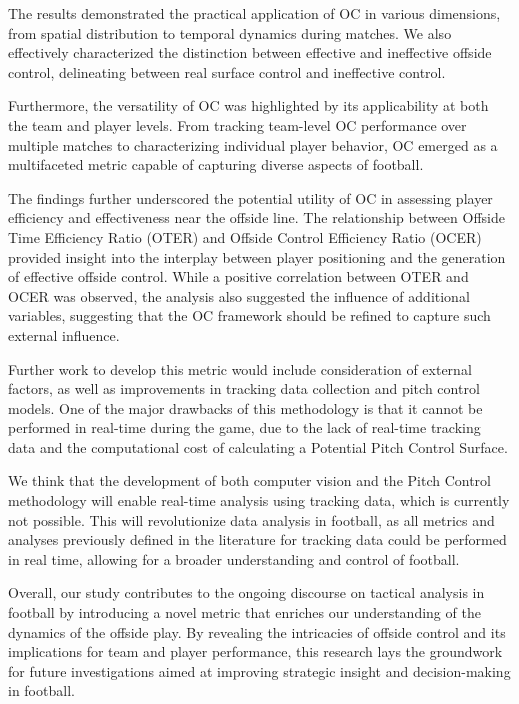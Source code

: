 \documentclass[
  10pt,
  twoside,nohyper]{book}
\begin{document}
The results demonstrated the practical application of OC in various dimensions, from spatial distribution to temporal dynamics during matches. We also effectively characterized the distinction between effective and ineffective offside control, delineating between real surface control and ineffective control.

Furthermore, the versatility of OC was highlighted by its applicability at both the team and player levels. From tracking team-level OC performance over multiple matches to characterizing individual player behavior, OC emerged as a multifaceted metric capable of capturing diverse aspects of football.

The findings further underscored the potential utility of OC in assessing player efficiency and effectiveness near the offside line. The relationship between Offside Time Efficiency Ratio (OTER) and Offside Control Efficiency Ratio (OCER) provided insight into the interplay between player positioning and the generation of effective offside control. While a positive correlation between OTER and OCER was observed, the analysis also suggested the influence of additional variables, suggesting that the OC framework should be refined to capture such external influence.

Further work to develop this metric would include consideration of external factors, as well as improvements in tracking data collection and pitch control models. One of the major drawbacks of this methodology is that it cannot be performed in real-time during the game, due to the lack of real-time tracking data and the computational cost of calculating a Potential Pitch Control Surface.

We think that the development of both computer vision and the Pitch Control methodology will enable real-time analysis using tracking data, which is currently not possible. This will revolutionize data analysis in football, as all metrics and analyses previously defined in the literature for tracking data could be performed in real time, allowing for a broader understanding and control of football.

Overall, our study contributes to the ongoing discourse on tactical analysis in football by introducing a novel metric that enriches our understanding of the dynamics of the offside play. By revealing the intricacies of offside control and its implications for team and player performance, this research lays the groundwork for future investigations aimed at improving strategic insight and decision-making in football.

\printbibliography
\end{document}
